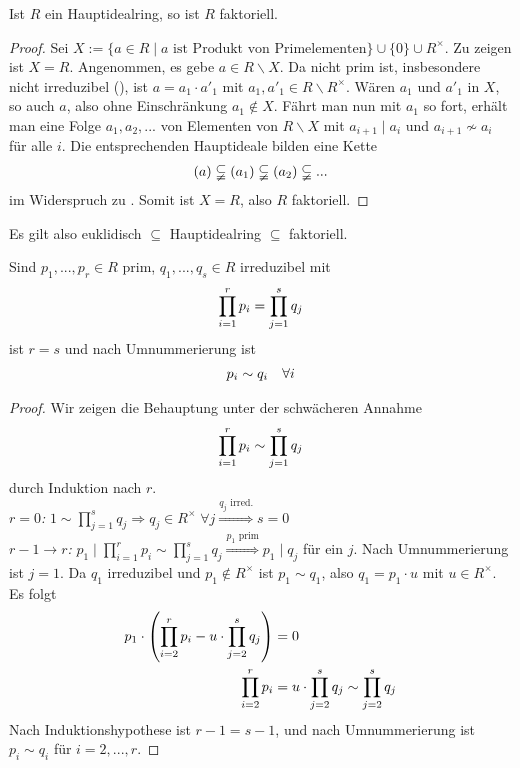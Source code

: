 \begin{proposition}
	Ist $R$ ein Hauptidealring, so ist $R$ faktoriell.
\end{proposition}
\begin{proof}
	Sei $X:=\{a\in R\mid a\text{ ist Produkt von Primelementen}\}\cup \{0\}\cup R^\times$. Zu zeigen ist $X=R$. Angenommen, es gebe $a\in R\backslash X$. Da nicht prim ist, insbesondere nicht irreduzibel (), ist $a=a_1\cdot a'_1$ mit $a_1,a'_1\in R\backslash R^\times$. Wären $a_1$ und $a'_1$ in $X$, so auch $a$, also ohne Einschränkung $a_1\notin X$. Fährt man nun mit $a_1$ so fort, erhält man eine Folge $a_1,a_2,...$ von Elementen von $R\backslash X$ mit $a_{i+1}\mid a_i$ und $a_{i+1}\nsim a_i$ für alle $i$. Die entsprechenden Hauptideale bilden eine Kette
	\begin{align}
		(a)\subsetneqq (a_1)\subsetneqq (a_2)\subsetneqq ...\notag
	\end{align}
	im Widerspruch zu . Somit ist $X=R$, also $R$ faktoriell.
\end{proof}

\begin{*anmerkung}
	Es gilt also euklidisch $\subseteq$ Hauptidealring $\subseteq$ faktoriell.
\end{*anmerkung}

\begin{lemma}
	Sind $p_1,...,p_r\in R$ prim, $q_1,...,q_s\in R$ irreduzibel mit 
	\begin{align}
		\prod_{i=1}^r p_i = \prod_{j=1}^s q_j \notag
	\end{align}
	ist $r=s$ und nach Umnummerierung ist
	\begin{align}
		p_i\sim q_i\quad\forall i\notag
	\end{align}
\end{lemma}
\begin{proof}
	Wir zeigen die Behauptung unter der schwächeren Annahme 
	\begin{align}
	\prod_{i=1}^r p_i \sim \prod_{j=1}^s q_j \notag
	\end{align}
	durch Induktion nach $r$. \\
	\emph{$r=0$:} $1\sim\prod_{j=1}^s q_j\Rightarrow q_j\in R^\times\;\forall j\overset{q_j\text{ irred.}}{\Rightarrow} s=0$ \\
	\emph{$r-1\to r$:} $p_1\mid \prod_{i=1}^r p_i\sim \prod_{j=1}^s q_j\overset{p_1 \text{ prim}}{\Rightarrow} p_1\mid q_j$ für ein $j$. Nach Umnummerierung ist $j=1$. Da $q_1$ irreduzibel und $p_1\notin R^\times$ ist $p_1\sim q_1$, also $q_1=p_1\cdot u$ mit $u\in R^\times$. Es folgt
	\begin{align}
		p_1\cdot \left(\prod_{i=2}^r p_i-u\cdot \prod_{j=2}^s q_j\right)&=0\notag \\
		\prod_{i=2}^r p_i &= u\cdot \prod_{j=2}^s q_j\sim \prod_{j=2}^s q_j\notag
	\end{align}
	Nach Induktionshypothese ist $r-1=s-1$, und nach Umnummerierung ist $p_i\sim q_i$ für $i=2,...,r$.
\end{proof}

